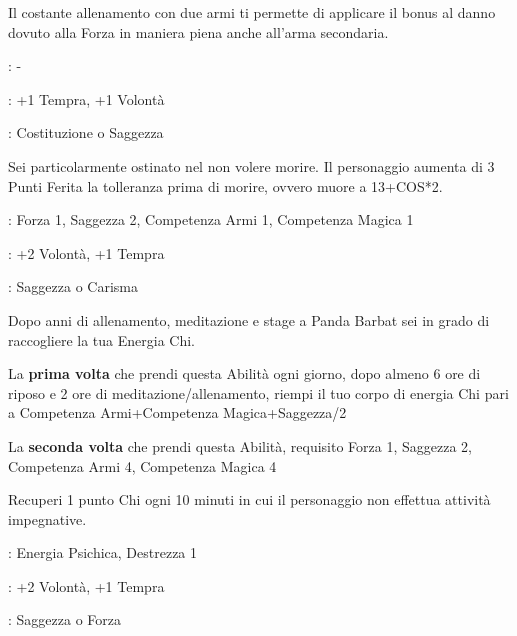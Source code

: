 \begin{multicols}{2}
Il costante allenamento con due armi ti permette di applicare il bonus al danno dovuto alla Forza in maniera piena anche all'arma secondaria.

\begin{description}[noitemsep, topsep=0pt, parsep=0pt, partopsep=0pt, leftmargin=0cm, labelwidth=2.5cm]
    \item[\textbf{Requisito}]: -
    \item[\textbf{Tiri Salvezza}]: +1 Tempra, +1 Volontà
    \item[\textbf{Caratteristica}]: Costituzione o Saggezza
\end{description}

Sei particolarmente ostinato nel non volere morire. Il personaggio aumenta di 3 Punti Ferita la tolleranza prima di morire, ovvero muore a 13+COS*2.

\begin{description}[noitemsep, topsep=0pt, parsep=0pt, partopsep=0pt, leftmargin=0cm, labelwidth=2.5cm]
    \item[\textbf{Requisito}]: Forza 1, Saggezza 2, Competenza Armi 1, Competenza Magica 1
    \item[\textbf{Tiri Salvezza}]: +2 Volontà, +1 Tempra
    \item[\textbf{Caratteristica}]: Saggezza o Carisma
\end{description}

Dopo anni di allenamento, meditazione e stage a Panda Barbat sei in grado di raccogliere la tua Energia Chi.

La \textbf{prima volta} che prendi questa Abilità ogni giorno, dopo almeno 6 ore di riposo e 2 ore di meditazione/allenamento, riempi il tuo corpo di energia Chi pari a Competenza Armi+Competenza Magica+Saggezza/2

La \textbf{seconda volta} che prendi questa Abilità, requisito Forza 1, Saggezza 2, Competenza Armi 4, Competenza Magica 4

Recuperi 1 punto Chi ogni 10 minuti in cui il personaggio non effettua attività impegnative.

\begin{description}[noitemsep, topsep=0pt, parsep=0pt, partopsep=0pt, leftmargin=0cm, labelwidth=2.5cm]
    \item[\textbf{Requisito}]: Energia Psichica, Destrezza 1
    \item[\textbf{Tiri Salvezza}]: +2 Volontà, +1 Tempra
    \item[\textbf{Caratteristica}]: Saggezza o Forza
\end{description}


\end{multicols}
